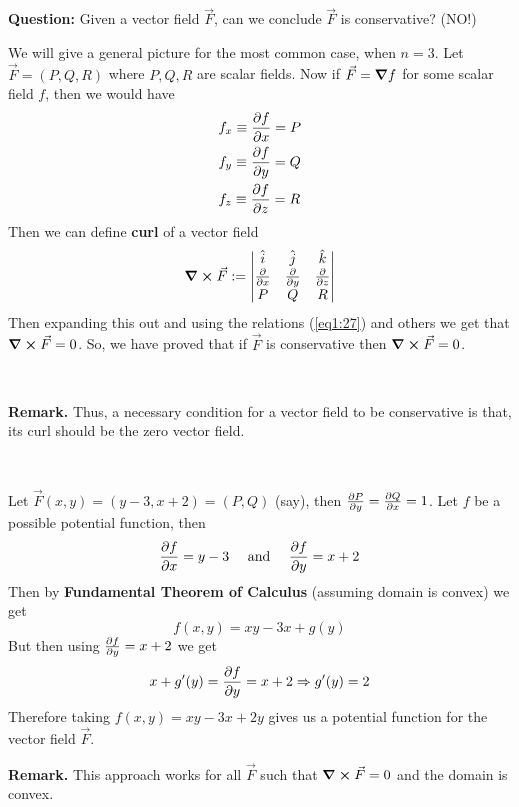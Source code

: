 \documentclass[../Analysis-3.tex]{subfiles}
\begin{document}
\textbf{Question:} Given a vector field $\vec{F}$, can we conclude $\vec{F}$ is conservative? (NO!)

We will give a general picture for the most common case, when $n = 3$. Let $\vec{F} = (P,Q,R)$ where $P,Q,R$ are scalar fields. Now if $\vec{F} = \grad f$ for some scalar field $f$, then we would have
\begin{align}\label{eq1:27}
   & f_x \equiv \pdv{f}{x} = P \nonumber \\
   & f_y \equiv \pdv{f}{y} = Q           \\
   & f_z \equiv \pdv{f}{z} = R \nonumber
\end{align}
Then we can define \textbf{curl} of a vector field
\[
  \curl \vec{F} := \begin{vmatrix}
    \hat{i}   & \hat{j}   & \hat{k}   \\
    \pdv{}{x} & \pdv{}{y} & \pdv{}{z} \\
    P         & Q         & R
  \end{vmatrix}
\]
Then expanding this out and using the relations (\ref{eq1:27}) and others we get that $\curl \vec{F} = 0$. So, we have proved that if $\vec{F}$ is conservative then $\curl \vec{F} = 0$.

\

\textbf{Remark.} Thus, a necessary condition for a vector field to be conservative is that, its curl should be the zero vector field.

\

\begin{Eg}{}{}
  Let $\vec{F}(x,y) = (y-3,x+2) = (P,Q)$ (say), then $\pdv{P}{y} = \pdv{Q}{x} = 1$. Let $f$ be a possible potential function, then
  \[
    \pdv{f}{x} = y-3 \quad \mbox{ and } \quad \pdv{f}{y} = x+2
  \]
  Then by \textbf{Fundamental Theorem of Calculus} (assuming domain is convex) we get
  \[
    f(x,y) = xy - 3x + g(y)
  \]
  But then using $\pdv{f}{y} = x+2$ we get
  \[
    x + g'(y) = \pdv{f}{y} = x+2 \Rightarrow g'(y) = 2
  \]
  Therefore taking $f(x,y) = xy - 3x + 2y$ gives us a potential function for the vector field $\vec{F}$.
\end{Eg}


\textbf{Remark.} This approach works for all $\vec{F}$ such that $\curl \vec{F} = 0$ and the domain is convex.
\end{document}
